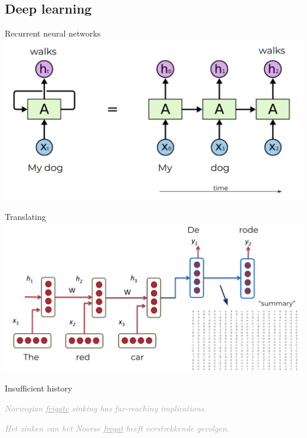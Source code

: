 \documentclass[pdf]{beamer}
\newcommand{\demo}[1]{\textit{\textcolor{darkgray}{#1}}}
\begin{document}
    \subsection{Deep learning} 

    \begin{frame}{Recurrent neural networks}
        \includegraphics[width=\textwidth]{figures/rnn.png}
    \end{frame}

    \begin{frame}{Translating}
        \includegraphics[width=\textwidth]{figures/encoder-decoder.png}
    \end{frame}

    \begin{frame}{Insufficient history}
        \begin{center}
            \demo{Norwegian \underline{frigate} sinking has far-reaching implications.}
        \end{center}
        \begin{center}
            \demo{Het zinken van het Noorse \underline{fregat} heeft verstrekkende gevolgen.}
        \end{center}
    \end{frame}
\end{document}
